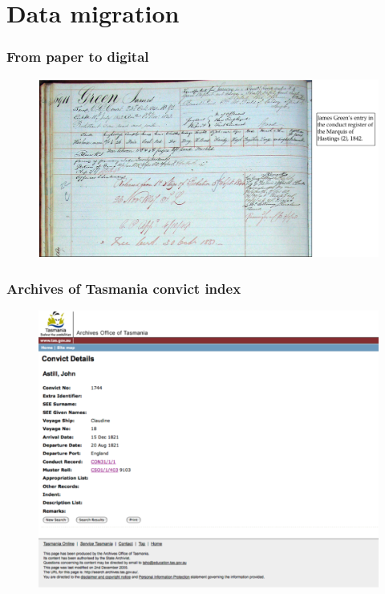 \documentclass[ignorenonframetext,11pt]{beamer}
\begin{document}
\section{Data migration}
\label{datamigration}

\begin{frame}
\frametitle{From paper to digital}
\label{frompapertodigital}

\begin{figure}
	\label{marquisofhastingsconductrecord}
	\begin{center}
	\includegraphics[keepaspectratio,width=\textwidth, height=.75\textheight]{images/conduct.png}
	\end{center}
	\end{figure}
	



\end{frame}
		

\begin{frame}
\frametitle{Archives of Tasmania convict index}
\label{archivesoftasmaniaconvictindex}

\begin{figure}
	\label{convictsearch}
	\begin{center}
	\includegraphics[keepaspectratio,width=\textwidth, height=.75\textheight]{images/Astill-aot.png}
	\end{center}
	\end{figure}
	



\end{frame}
		
\end{document}
